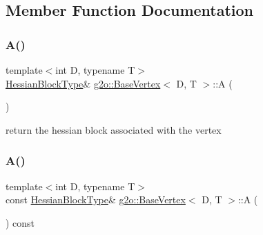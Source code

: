 \subsection{Member Function Documentation}
\mbox{\label{classg2o_1_1_base_vertex_a43bcf2bb3420a0b2cb80bfd297b464a6}} 
\subsubsection{\texorpdfstring{A()}{A()}\hspace{0.1cm}{\footnotesize\ttfamily [1/2]}}
{\footnotesize\ttfamily template$<$int D, typename T$>$ \\
\mbox{\hyperlink{classg2o_1_1_base_vertex_a887928bc60710e0ec9acb269ee7411db}{Hessian\+Block\+Type}}\& \mbox{\hyperlink{classg2o_1_1_base_vertex}{g2o\+::\+Base\+Vertex}}$<$ D, T $>$\+::A (\begin{DoxyParamCaption}{ }\end{DoxyParamCaption})\hspace{0.3cm}{\ttfamily [inline]}}



return the hessian block associated with the vertex 

\mbox{\label{classg2o_1_1_base_vertex_a3efca26127cda4f9b77a06352f1267bb}} 
\subsubsection{\texorpdfstring{A()}{A()}\hspace{0.1cm}{\footnotesize\ttfamily [2/2]}}
{\footnotesize\ttfamily template$<$int D, typename T$>$ \\
const \mbox{\hyperlink{classg2o_1_1_base_vertex_a887928bc60710e0ec9acb269ee7411db}{Hessian\+Block\+Type}}\& \mbox{\hyperlink{classg2o_1_1_base_vertex}{g2o\+::\+Base\+Vertex}}$<$ D, T $>$\+::A (\begin{DoxyParamCaption}{ }\end{DoxyParamCaption}) const\hspace{0.3cm}{\ttfamily [inline]}}

\mbox{\label{classg2o_1_1_base_vertex_a837ef1047343d927edb48ad8d510fe90}} 
